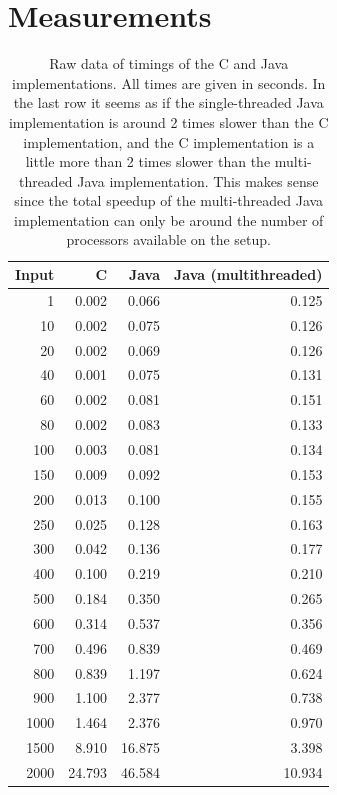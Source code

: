 \documentclass{article}
\begin{document}
	\section{Measurements}
	\begin{table}[H]
		\centering
		\begin{tabular}{|r|r|r|r|}
			\hline
			Input	& C			& Java		& Java (multithreaded)\\\hline
			1&	0.002&	0.066&	0.125\\\hline
			10&	0.002&	0.075&	0.126\\\hline
			20&	0.002&	0.069&	0.126\\\hline
			40&	0.001&	0.075&	0.131\\\hline
			60&	0.002&	0.081&	0.151\\\hline
			80&	0.002&	0.083&	0.133\\\hline
			100&	0.003&	0.081&	0.134\\\hline
			150&	0.009&	0.092&	0.153\\\hline
			200&	0.013&	0.100&	0.155\\\hline
			250&	0.025&	0.128&	0.163\\\hline
			300&	0.042&	0.136&	0.177\\\hline
			400&	0.100&	0.219&	0.210\\\hline
			500&	0.184&	0.350&	0.265\\\hline
			600&	0.314&	0.537&	0.356\\\hline
			700&	0.496&	0.839&	0.469\\\hline
			800&	0.839&	1.197&	0.624\\\hline
			900&	1.100&	2.377&	0.738\\\hline
			1000&	1.464&	2.376&	0.970\\\hline
			1500&	8.910&	16.875&	3.398\\\hline
			2000&	24.793&	46.584&	10.934\\\hline
		\end{tabular}
		\caption{Raw data of timings of the C and Java implementations. All times are given in seconds. In the last row it seems as if the single-threaded Java implementation is around 2 times slower than the C implementation, and the C implementation is a little more than 2 times slower than the multi-threaded Java implementation. This makes sense since the total speedup of the multi-threaded Java implementation can only be around the number of processors available on the setup.}
	\end{table}
	
\end{document}
